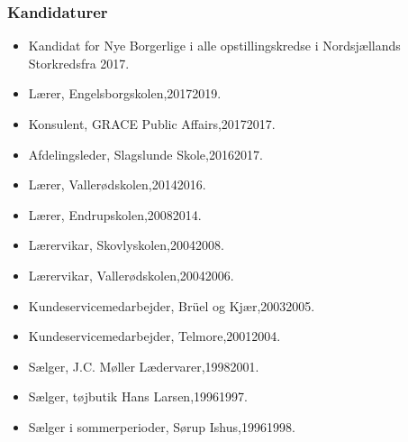 \documentclass[11pt, a4paper]{awesome-cv}
\begin{document}
\begin{cvletter}
\subsubsection*{Kandidaturer}
\begin{itemize}
\item Kandidat for Nye Borgerlige i alle opstillingskredse i Nordsjællands Storkredsfra 2017.
\end{itemize}
\begin{itemize}
\item Lærer, Engelsborgskolen,20172019.
\item Konsulent, GRACE Public Affairs,20172017.
\item Afdelingsleder, Slagslunde Skole,20162017.
\item Lærer, Vallerødskolen,20142016.
\item Lærer, Endrupskolen,20082014.
\item Lærervikar, Skovlyskolen,20042008.
\item Lærervikar, Vallerødskolen,20042006.
\item Kundeservicemedarbejder, Brüel og Kjær,20032005.
\item Kundeservicemedarbejder, Telmore,20012004.
\item Sælger, J.C. Møller Lædervarer,19982001.
\item Sælger, tøjbutik Hans Larsen,19961997.
\item Sælger i sommerperioder, Sørup Ishus,19961998.
\end{itemize}
\end{cvletter}
\end{document}
